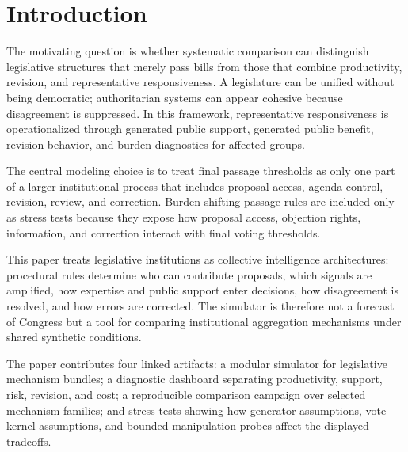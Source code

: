\documentclass[manuscript]{acmart}
\begin{document}


\maketitle

\section{Introduction}

The motivating question is whether systematic comparison can distinguish legislative structures that merely pass bills from those that combine productivity, revision, and representative responsiveness. A legislature can be unified without being democratic; authoritarian systems can appear cohesive because disagreement is suppressed. In this framework, representative responsiveness is operationalized through generated public support, generated public benefit, revision behavior, and burden diagnostics for affected groups.

The central modeling choice is to treat final passage thresholds as only one part of a larger institutional process that includes proposal access, agenda control, revision, review, and correction. Burden-shifting passage rules are included only as stress tests because they expose how proposal access, objection rights, information, and correction interact with final voting thresholds.

This paper treats legislative institutions as collective intelligence architectures: procedural rules determine who can contribute proposals, which signals are amplified, how expertise and public support enter decisions, how disagreement is resolved, and how errors are corrected. The simulator is therefore not a forecast of Congress but a tool for comparing institutional aggregation mechanisms under shared synthetic conditions.

The paper contributes four linked artifacts: a modular simulator for legislative mechanism bundles; a diagnostic dashboard separating productivity, support, risk, revision, and cost; a reproducible comparison campaign over selected mechanism families; and stress tests showing how generator assumptions, vote-kernel assumptions, and bounded manipulation probes affect the displayed tradeoffs.
\end{document}
